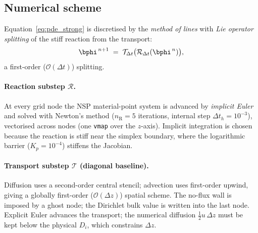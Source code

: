 \subsection{Numerical scheme}
\label{sec:pde_numerics}
Equation~\eqref{eq:pde_strong} is discretised by the \emph{method of lines} with
\emph{Lie operator splitting} of the stiff reaction from the transport:
\begin{equation}
  \bphi^{\,n+1} \;=\; \mathcal{T}_{\Delta t}\bigl(\mathcal{R}_{\Delta t}(\bphi^{\,n})\bigr),
  \label{eq:splitting}
\end{equation}
a first-order ($\mathcal{O}(\Delta t)$) splitting.

\paragraph{Reaction substep $\mathcal{R}$.}
At every grid node the NSP material-point system is advanced by \emph{implicit Euler}
and solved with Newton's method ($n_{\mathrm R}=5$ iterations, internal step
$\Delta t_h=10^{-3}$), vectorised across nodes (one \texttt{vmap} over the $z$-axis).
Implicit integration is chosen because the reaction is stiff near the simplex boundary,
where the logarithmic barrier ($K_p=10^{-4}$) stiffens the Jacobian.

\paragraph{Transport substep $\mathcal{T}$ (diagonal baseline).}
Diffusion uses a second-order central stencil; advection uses first-order upwind, giving a
globally first-order ($\mathcal{O}(\Delta z)$) spatial scheme. The no-flux wall is imposed
by a ghost node; the Dirichlet bulk value is written into the last node. Explicit Euler
advances the transport; the numerical diffusion $\tfrac12 u\,\Delta z$ must be kept below
the physical $D_i$, which constrains $\Delta z$.

